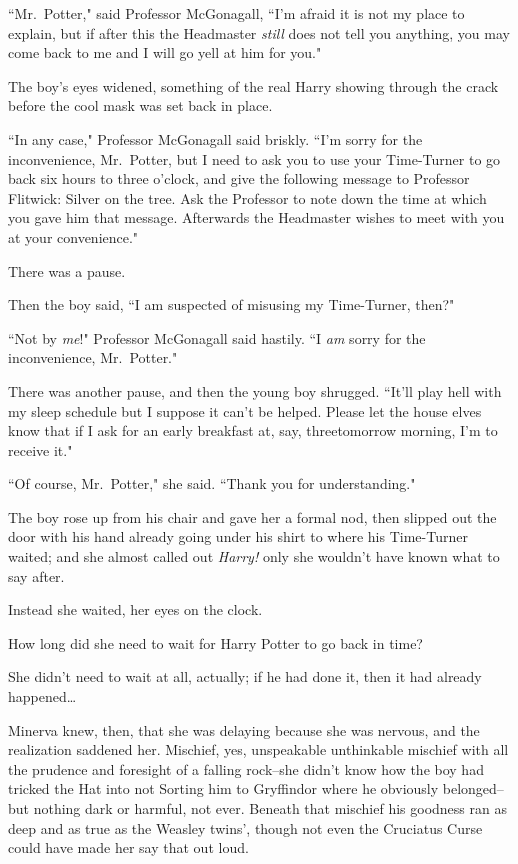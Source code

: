 ``Mr.~Potter," said Professor McGonagall, ``I'm afraid it is not my place to explain, but if after this the Headmaster \emph{still} does not tell you anything, you may come back to me and I will go yell at him for you."

The boy's eyes widened, something of the real Harry showing through the crack before the cool mask was set back in place.

``In any case," Professor McGonagall said briskly. ``I'm sorry for the inconvenience, Mr.~Potter, but I need to ask you to use your Time-Turner to go back six hours to three o'clock, and give the following message to Professor Flitwick: Silver on the tree. Ask the Professor to note down the time at which you gave him that message. Afterwards the Headmaster wishes to meet with you at your convenience."

There was a pause.

Then the boy said, ``I am suspected of misusing my Time-Turner, then?"

``Not by \emph{me}!" Professor McGonagall said hastily. ``I \emph{am} sorry for the inconvenience, Mr.~Potter."

There was another pause, and then the young boy shrugged. ``It'll play hell with my sleep schedule but I suppose it can't be helped. Please let the house elves know that if I ask for an early breakfast at, say, three\am tomorrow morning, I'm to receive it."

``Of course, Mr.~Potter," she said. ``Thank you for understanding."

The boy rose up from his chair and gave her a formal nod, then slipped out the door with his hand already going under his shirt to where his Time-Turner waited; and she almost called out \emph{Harry!} only she wouldn't have known what to say after.

Instead she waited, her eyes on the clock.

How long did she need to wait for Harry Potter to go back in time?

She didn't need to wait at all, actually; if he had done it, then it had already happened{\ldots}

Minerva knew, then, that she was delaying because she was nervous, and the realization saddened her. Mischief, yes, unspeakable unthinkable mischief with all the prudence and foresight of a falling rock\---she didn't know how the boy had tricked the Hat into not Sorting him to Gryffindor where he obviously belonged\---but nothing dark or harmful, not ever. Beneath that mischief his goodness ran as deep and as true as the Weasley twins', though not even the Cruciatus Curse could have made her say that out loud.


